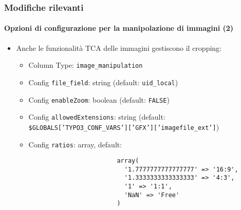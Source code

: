 \begin{frame}[fragile]
	\frametitle{Modifiche rilevanti}
	\framesubtitle{Opzioni di configurazione per la manipolazione di immagini (2)}

	\lstset{basicstyle=\smaller\ttfamily}

	\begin{itemize}
		\item Anche le funzionalità TCA delle immagini gestiscono il cropping:

			\begin{itemize}
				\item Column Type: \texttt{image\_manipulation}
				\item Config \texttt{file\_field}: string	\tabto{5.6cm}(default: \texttt{uid\_local})
				\item Config \texttt{enableZoom}: boolean	\tabto{5.6cm}(default: \texttt{FALSE})
				\item Config \texttt{allowedExtensions}: string\newline
					(default: \smaller\texttt{\$GLOBALS['TYPO3\_CONF\_VARS']['GFX']['imagefile\_ext']}\small)
				\item Config \texttt{ratios}: array, default:

					\begin{lstlisting}
						array(
						  '1.7777777777777777' => '16:9',
						  '1.3333333333333333' => '4:3',
						  '1' => '1:1',
						  'NaN' => 'Free'
						)
					\end{lstlisting}
			\end{itemize}

	\end{itemize}

\end{frame}

